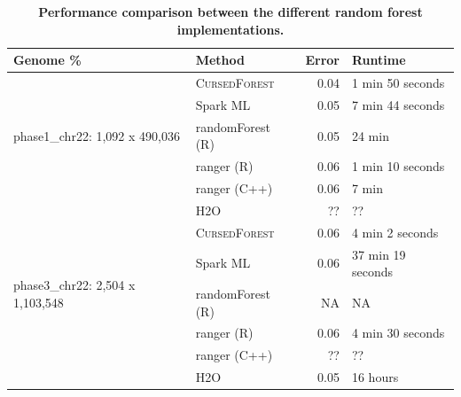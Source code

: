 \documentclass[10pt,letterpaper]{article}
\newcommand{\cursedforest}{\textsc{CursedForest}\ }
\begin{document}
\begin{table}[!ht]
\begin{minipage}{\textwidth}
\centering
\caption{ {\bf Performance comparison between the different random forest implementations.}}
\begin{tabular}{| l | l | r | l |}
\hline
\bf{Genome \%}                      & \bf{Method} & \bf{Error}  & \bf{Runtime}  \\

\hline

\multirow{5}{*}{phase1\_chr22: 1,092 x 490,036} & \cursedforest\ & 0.04  & 1 min 50 seconds                        \\
                                                & Spark ML  &  0.05           &           7 min 44 seconds         \\
                                                & randomForest (R)         & 0.05       & 24 min           \\
                                                & ranger (R)      & 0.06       & 1 min 10 seconds       \\
                                                & ranger (C++)     & 0.06       & 7 min            \\
                                                & H2O           & ??       & ??         \\

\hline

\multirow{5}{*}{phase3\_chr22: 2,504 x 1,103,548}   & \cursedforest\ & 0.06 & 4 min 2 seconds \\
                                                    & Spark ML  & 0.06 & 37 min 19 seconds \\
                                                    & randomForest (R)        & NA         & NA                \\
                                                    & ranger (R)    & 0.06       & 4 min 30 seconds     \\
                                                    & ranger (C++)     &     ??   & ??        \\
                                                    & H2O           & 0.05       & 16 hours         \\

\hline


\end{tabular}
\end{minipage}
\end{table}
\end{document}
